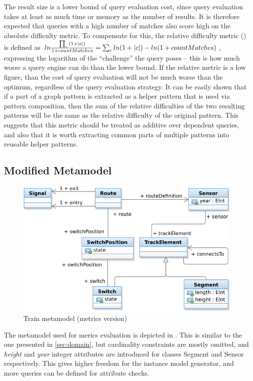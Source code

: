 The result size is a lower bound of query evaluation cost, since query
evaluation takes at least as much time or memory as the number of results. It is
therefore expected that queries with a high number of matches also score high on
the absolute difficulty metric. To compensate for this, the relative difficulty
metric () is defined as
$ln\frac{\prod_{c}{(1+|{c}|)}}{1+countMatches} = \sum_{c}{ln(1+|{c}|)} -
ln(1+countMatches)$, expressing the logarithm of the ``challenge'' the query
poses -- this is how much worse a query engine can do than the lower bound. 
If the relative metric is a low figure, than the cost of query evaluation will not
be much worse than the optimum, regardless of the query evaluation strategy. It
can be easily shown that if a part of a graph pattern is extracted as a helper
pattern that is used via pattern composition, then the sum of the relative
difficulties of the two resulting patterns will be the same as the relative
difficulty of the original pattern. This suggests that this metric should be
treated as additive over dependent queries, and also that it is worth extracting
common parts of multiple patterns into reusable helper patterns.

\subsection{Modified Metamodel}

\begin{figure}[Hhtb]
\begin{center}
\includegraphics[width=12cm]{figures/TrainMMMet.pdf}
\caption{Train metamodel (metrics version)}
\label{fig:metamodel-met}
\end{center}
\end{figure}

The metamodel used for merics evaluation is depicted in . This is similar to the one presented in \autoref{sec:domain}, but cardinality constraints are mostly omitted, and \emph{height} and \emph{year} integer attributes are introduced for classes Segment and Sensor respectively. This gives higher freedom for the instance model generator, and more queries can be defined for attribute checks.

